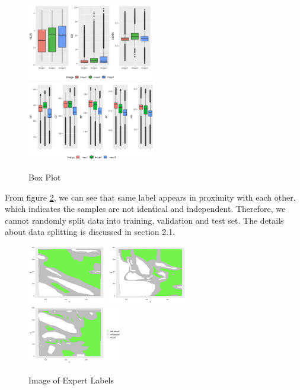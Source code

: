 \documentclass[11pt]{article}
\begin{document}
\begin{figure}[h]
\includegraphics[width=0.49\textwidth]{1-2-3.jpeg}
\includegraphics[width=0.50\textwidth]{1-2-3-2.png}
\centering
\caption{Box Plot}
\label{fig:1-2-2}
\centering
\end{figure}

From figure \ref{fig:1-2-3}, we can see that same label appears in proximity with each other, which indicates the samples are not identical and independent. Therefore, we cannot randomly split data into training, validation and test set. The details about data splitting is discussed in section 2.1.

\begin{figure}[h]
\includegraphics[width=0.31\textwidth]{1-2-4.jpeg}
\includegraphics[width=0.31\textwidth]{1-2-5.jpeg}
\includegraphics[width=0.37\textwidth]{1-2-6.jpeg}
\caption{Image of Expert Labels}
\label{fig:1-2-3}
\centering
\end{figure}
\end{document}
